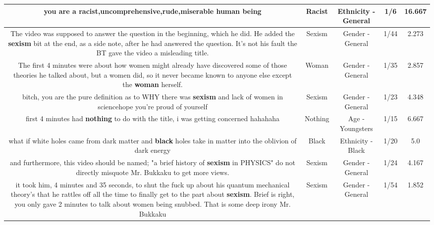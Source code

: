 \documentclass[11pt]{article}
\newlength\mylength
\begin{document}
\begin{center}
\begin{longtable}{|C{.65\mylength}|C{.30\mylength}|C{.12\mylength}|C{.12\mylength}|C{.12\mylength}|}
  \small you are a \textbf{racist},uncomprehensive,rude,miserable human being\normalsize   & Racist & Ethnicity - General & 1/6 & 16.667 \\  \hline
  \small The video was supposed to answer the question in the beginning, which he did.  He added the \textbf{sexism} bit at the end, as a side note, after he had answered the question.  It's not his fault the BT gave the video a misleading title.\normalsize   & Sexism & Gender - General & 1/44 & 2.273 \\  \hline
  \small The first 4 minutes were about how women might already have discovered some of those theories he talked about, but a women did, so it never became known to anyone else except the \textbf{woman} herself.\normalsize   & Woman & Gender - General & 1/35 & 2.857 \\  \hline
  \small bitch, you are the pure definition as to WHY there was \textbf{sexism} and lack of women in sciencehope you're proud of yourself\normalsize   & Sexism & Gender - General & 1/23 & 4.348 \\  \hline
  \small first 4 minutes had \textbf{nothing} to do with the title, i was getting concerned hahahaha\normalsize   & Nothing & Age - Youngsters & 1/15 & 6.667 \\  \hline
  \small what if white holes came from dark matter and \textbf{black} holes take in matter into the oblivion of dark energy\normalsize   & Black & Ethnicity - Black & 1/20 & 5.0 \\  \hline
  \small and furthermore, this video should be named; "a brief history of \textbf{sexism} in PHYSICS" do not directly misquote Mr. Bukkaku to get more views.\normalsize   & Sexism & Gender - General & 1/24 & 4.167 \\  \hline
  \small it took him, 4 minutes and 35 seconds, to shut the fuck up about his quantum mechanical theory's that he rattles off all the time to finally get to the part about \textbf{sexism}. Brief is right, you only gave 2 minutes to talk about women being snubbed. That is some deep irony Mr. Bukkaku\normalsize   & Sexism & Gender - General & 1/54 & 1.852 \\  \hline

\end{longtable}
\end{center}
\end{document}
